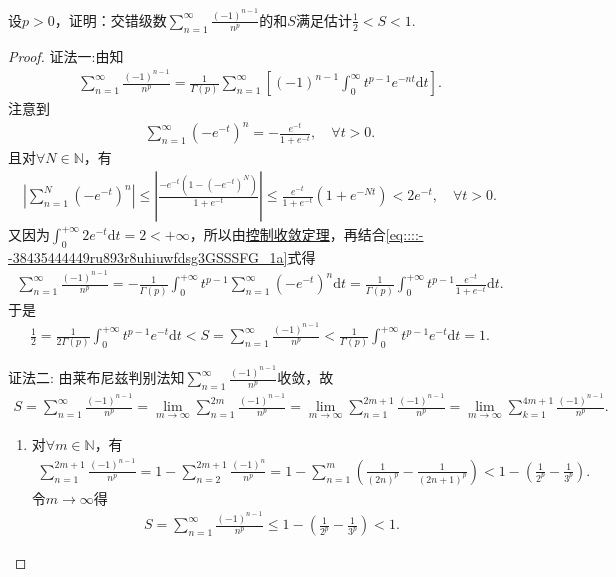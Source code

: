 \documentclass[../../main.tex]{subfiles}%
\begin{document}
\begin{example}
设$p>0$，证明：交错级数$\sum\limits_{n=1}^{\infty} \frac{(-1)^{n-1}}{n^p}$的和$S$满足估计$\frac{1}{2} < S < 1$.
\end{example}
\begin{proof}

{\color{blue}证法一:}由知
\begin{align}\label{eq::::--38435444449ru893r8uhiuwfdsg3GSSSFG_1a}
\sum\limits_{n=1}^{\infty}\frac{(-1)^{n-1}}{n^p}=\frac{1}{\Gamma(p)}\sum\limits_{n=1}^{\infty}\left[ (-1)^{n-1}\int_{0}^{\infty} t^{p-1}e^{-nt}\mathrm{d}t \right].
\end{align}
注意到
\begin{align*}
\sum\limits_{n=1}^{\infty}(-e^{-t})^n=-\frac{e^{-t}}{1+e^{-t}},\quad \forall t>0.
\end{align*}
且对$\forall N\in \mathbb{N}$，有
\begin{align*}
\left| \sum\limits_{n=1}^N (-e^{-t})^n \right|\leqslant \left| \frac{-e^{-t}\left( 1-(-e^{-t})^N \right)}{1+e^{-t}} \right|\leqslant \frac{e^{-t}}{1+e^{-t}}\left( 1+e^{-Nt} \right) <2e^{-t},\quad \forall t>0.
\end{align*}
又因为$\int_{0}^{+\infty}2e^{-t}\mathrm{d}t=2<+\infty$，所以由\hyperref[Real Analysis-theorem:控制收敛定理]{控制收敛定理}，再结合\eqref{eq::::--38435444449ru893r8uhiuwfdsg3GSSSFG_1a}式得
\begin{align*}
\sum\limits_{n=1}^{\infty}\frac{(-1)^{n-1}}{n^p}=-\frac{1}{\Gamma(p)}\int_{0}^{+\infty}t^{p-1}\sum\limits_{n=1}^{\infty}(-e^{-t})^n \mathrm{d}t=\frac{1}{\Gamma(p)}\int_{0}^{+\infty}t^{p-1}\frac{e^{-t}}{1+e^{-t}}\mathrm{d}t.
\end{align*}
于是
\begin{align*}
\frac{1}{2}=\frac{1}{2\Gamma(p)}\int_{0}^{+\infty}t^{p-1}e^{-t}\mathrm{d}t<S=\sum\limits_{n=1}^{\infty}\frac{(-1)^{n-1}}{n^p}<\frac{1}{\Gamma(p)}\int_{0}^{+\infty}t^{p-1}e^{-t}\mathrm{d}t=1.
\end{align*}

{\color{blue}证法二:}
由莱布尼兹判别法知$\sum\limits_{n=1}^{\infty} \frac{(-1)^{n-1}}{n^p}$收敛，故
\begin{align*}
S=\sum_{n=1}^{\infty}{\frac{(-1)^{n-1}}{n^p}}=\lim_{m\rightarrow \infty} \sum_{n=1}^{2m}{\frac{(-1)^{n-1}}{n^p}}=\lim_{m\rightarrow \infty} \sum_{n=1}^{2m+1}{\frac{(-1)^{n-1}}{n^p}}=\lim_{m\rightarrow \infty} \sum_{k=1}^{4m+1}{\frac{\left( -1 \right) ^{n-1}}{n^p}}.
\end{align*}
\begin{enumerate}[(1)]
\item 对$\forall m\in \mathbb{N}$，有
\begin{align*}
\sum\limits_{n=1}^{2m+1} \frac{(-1)^{n-1}}{n^p} = 1 - \sum\limits_{n=2}^{2m+1} \frac{(-1)^n}{n^p} = 1 - \sum\limits_{n=1}^{m} \left( \frac{1}{(2n)^p} - \frac{1}{(2n+1)^p} \right) < 1 - \left( \frac{1}{2^p} - \frac{1}{3^p} \right).
\end{align*}
令$m\to\infty$得
\begin{align*}
S=\sum\limits_{n=1}^{\infty} \frac{(-1)^{n-1}}{n^p} \leqslant 1 - \left( \frac{1}{2^p} - \frac{1}{3^p} \right) < 1.
\end{align*}


\end{enumerate}
\end{proof}
\end{document}
